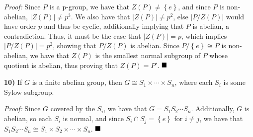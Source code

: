 \documentclass[12pt]{article}
\newcommand{\braceb}[1]{\left\{#1\right\}}
\newcommand{\vertb}[1]{\left\vert#1\right\vert}
\newcommand{\proof}{\textit{Proof: }}
\newcommand{\done}{\ensuremath{\strut\hfill\blacksquare}}
\begin{document}
\proof
Since \( P \) is a p-group, we have that \( Z(P) \ne \braceb{e} \), and since
\( P \) is non-abelian, \( \vertb{Z(P)} \ne p^3 \).
We also have that \( \vertb{Z(P)} \ne p^2 \), else \( \vertb{P / Z(P)} \)
would have order \( p \) and thus be cyclic, additionally implying that \( P \)
is abelian, a contradiction.
Thus, it must be the case that \( \vertb{Z(P)} = p \), which implies
\( \vertb{P / Z(P)} = p^2 \), showing that \( P / Z(P) \) is abelian.
Since \( P / \braceb{e} \cong P \) is non-abelian, we have that
\( Z(P) \) is the smallest normal subgroup of \( P \) whose quotient is
abelian, thus proving that \( Z(P) = P' \).
\done

\textbf{10)}
If \( G \) is a finite abelian group, then
\( G \cong S_1 \times \cdots \times S_n \), where each \( S_i \) is some Sylow
subgroup.

\proof
Since \( G \) covered by the \( S_i \), we have that
\( G = S_1S_2 \cdots S_n \).
Additionally, \( G \) is abelian, so each \( S_i \) is normal, and since
\( S_i \cap S_j = \braceb{e} \) for \( i \ne j \), we have that
\( S_1S_2 \cdots S_n \cong S_1 \times S_2 \times \cdots \times S_n \).
\done
\end{document}
